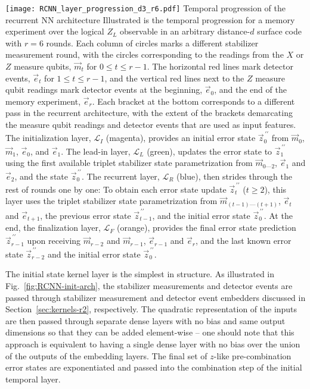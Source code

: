 \begin{figure*}[htb]
\centering
\texttt{[image: RCNN\_layer\_progression\_d3\_r6.pdf]}
\ccaption
{Temporal progression of the recurrent NN architecture}
{
Illustrated is the temporal progression for a memory experiment over the logical $Z_L$ observable in an arbitrary distance-$d$ surface code with $r=6$ rounds. Each column of circles marks a different stabilizer measurement round, with the circles corresponding to the readings from the $X$ or $Z$ measure qubits, $\vec{m}_t$ for $0\leq t \leq r-1$. The horizontal red lines mark  detector events, $\vec{e}_t$ for $1 \leq t \leq r-1$, and the vertical red lines next to the $Z$ measure qubit readings mark  detector events at the beginning, $\vec{e}_0$, and the end of the memory experiment, $\vec{e}_{r}$.
Each bracket at the bottom corresponds to a different pass in the recurrent architecture, with the extent of the brackets demarcating the measure qubit readings and detector events that are used as input features.
The initialization layer, $\mathcal{L}_I$ (magenta), provides an initial error state $\vec{z}^{\,\prime\prime}_0$ from $\vec{m}_0$, $\vec{m}_1$, $\vec{e}_0$, and $\vec{e}_1$.
The lead-in layer, $\mathcal{L}_L$ (green), updates the error state to $\vec{z}^{\,\prime\prime}_1$ using the first available triplet stabilizer state parametrization from $\vec{m}_{0 \text{---} 2}$, $\vec{e}_1$ and $\vec{e}_2$, and the state $\vec{z}^{\,\prime\prime}_0$.
The recurrent layer, $\mathcal{L}_R$ (blue), then strides through the rest of rounds one by one: To obtain each error state update $\vec{z}^{\,\prime\prime}_{t}$ ($t\geq2$), this layer uses the triplet stabilizer state parametrization from $\vec{m}_{(t-1) \text{---} (t+1)}$, $\vec{e}_{t}$ and $\vec{e}_{t+1}$, the previous error state $\vec{z}^{\,\prime\prime}_{t-1}$, and the initial error state $\vec{z}^{\,\prime\prime}_{0}$.
At the end, the finalization layer, $\mathcal{L}_F$ (orange), provides the final error state prediction $\vec{z}^{\,\prime\prime}_{r-1}$ upon receiving $\vec{m}_{r-2}$ and $\vec{m}_{r-1}$, $\vec{e}_{r-1}$ and $\vec{e}_r$, and the last known error state $\vec{z}^{\,\prime\prime}_{r-2}$ and the initial error state $\vec{z}^{\,\prime\prime}_{0}$.
}
\label{fig:RCNN-layer-prog}
\end{figure*}


The initial state kernel layer is the simplest in structure. As illustrated in Fig.~\ref{fig:RCNN-init-arch}, the stabilizer measurements and detector events are passed through stabilizer measurement and detector event embedders discussed in Section~\ref{sec:kernels-r2}, respectively. 
The quadratic representation of the inputs are then passed through separate dense layers with no bias and same output dimensions so that they can be added element-wise -- one should note that this approach is equivalent to having a single dense layer with no bias over the union of the outputs of the embedding layers. 
The final set of $z$-like pre-combination error states are exponentiated and passed into the combination step of the initial temporal layer.



